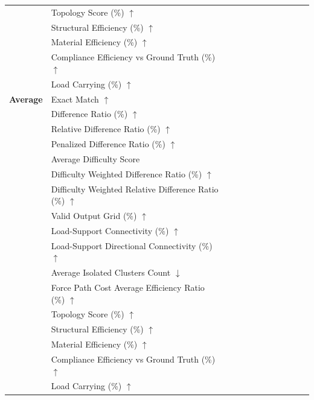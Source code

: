 \begin{table}[!h]
{\begin{tabular}{llllllllllll}
 & Topology Score (\%) $\uparrow$ &  &  &  &  &  &  &  &  &  &  \\
 & Structural Efficiency (\%) $\uparrow$ &  &  &  &  &  &  &  &  &  &  \\
 & Material Efficiency (\%) $\uparrow$ &  &  &  &  &  &  &  &  &  &  \\
 & Compliance Efficiency vs Ground Truth (\%) $\uparrow$ &  &  &  &  &  &  &  &  &  &  \\
 & Load Carrying (\%) $\uparrow$ &  &  &  &  &  &  &  &  &  &  \\
\midrule
\textbf{Average} & Exact Match $\uparrow$ &  &  &  &  &  &  &  &  &  &  \\
 & Difference Ratio (\%) $\uparrow$ &  &  &  &  &  &  &  &  &  &  \\
 & Relative Difference Ratio (\%) $\uparrow$ &  &  &  &  &  &  &  &  &  &  \\
 & Penalized Difference Ratio (\%) $\uparrow$ &  &  &  &  &  &  &  &  &  &  \\
 & Average Difficulty Score &  &  &  &  &  &  &  &  &  &  \\
 & Difficulty Weighted Difference Ratio (\%) $\uparrow$ &  &  &  &  &  &  &  &  &  &  \\
 & Difficulty Weighted Relative Difference Ratio (\%) $\uparrow$ &  &  &  &  &  &  &  &  &  &  \\
 & Valid Output Grid (\%) $\uparrow$ &  &  &  &  &  &  &  &  &  &  \\
 & Load-Support Connectivity (\%) $\uparrow$ &  &  &  &  &  &  &  &  &  &  \\
 & Load-Support Directional Connectivity (\%) $\uparrow$ &  &  &  &  &  &  &  &  &  &  \\
 & Average Isolated Clusters Count $\downarrow$ &  &  &  &  &  &  &  &  &  &  \\
 & Force Path Cost Average Efficiency Ratio (\%) $\uparrow$ &  &  &  &  &  &  &  &  &  &  \\
 & Topology Score (\%) $\uparrow$ &  &  &  &  &  &  &  &  &  &  \\
 & Structural Efficiency (\%) $\uparrow$ &  &  &  &  &  &  &  &  &  &  \\
 & Material Efficiency (\%) $\uparrow$ &  &  &  &  &  &  &  &  &  &  \\
 & Compliance Efficiency vs Ground Truth (\%) $\uparrow$ &  &  &  &  &  &  &  &  &  &  \\
 & Load Carrying (\%) $\uparrow$ &  &  &  &  &  &  &  &  &  &  \\
\midrule\midrule

\end{tabular}}
\end{table}
